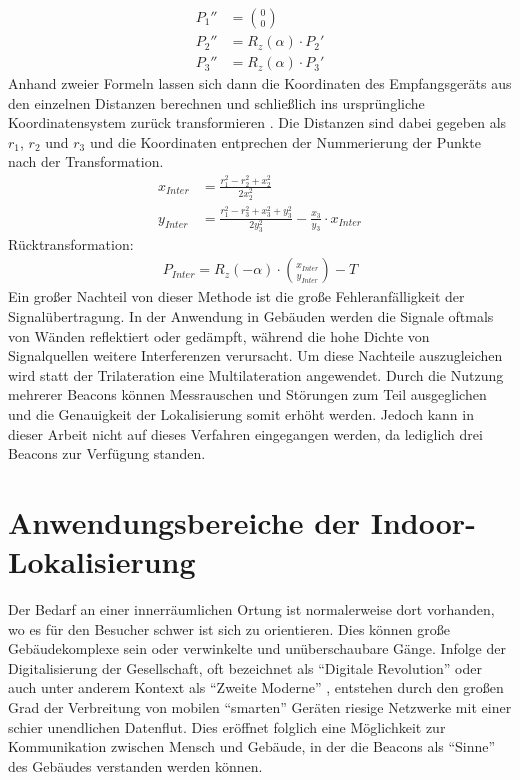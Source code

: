 \begin{align*}
P_1'' &= \binom{0}{0}\\
P_2'' &= R_z\left ( \alpha \right ) \cdot P_2'\\
P_3'' &= R_z\left ( \alpha \right ) \cdot P_3'
\end{align*}
Anhand zweier Formeln lassen sich dann die Koordinaten des Empfangsgeräts aus den einzelnen Distanzen berechnen und schließlich ins ursprüngliche Koordinatensystem zurück transformieren \cite{Trilat}. Die Distanzen sind dabei gegeben als $r_1$, $r_2$ und $r_3$ und die Koordinaten entprechen der Nummerierung der Punkte nach der Transformation.
\begin{align*}
x_{Inter} &= \frac{r_1^2-r_2^2+x_2^2}{2x_2^2}\\
y_{Inter} &= \frac{r_1^2-r_3^2+x_3^2+y_3^2}{2y_3^2}-\frac{x_3}{y_3}\cdot x_{Inter}
\end{align*}
Rücktransformation:
\begin{align*}
P_{Inter} = R_z\left ( -\alpha \right ) \cdot \binom{x_{Inter}}{y_{Inter}} - T
\end{align*}
Ein großer Nachteil von dieser Methode ist die große Fehleranfälligkeit der Signalübertragung. In der Anwendung in Gebäuden werden die Signale oftmals von Wänden reflektiert oder gedämpft, während die hohe Dichte von Signalquellen weitere Interferenzen verursacht. Um diese Nachteile auszugleichen wird statt der Trilateration eine Multilateration angewendet. Durch die Nutzung mehrerer Beacons können Messrauschen und Störungen zum Teil ausgeglichen und die Genauigkeit der Lokalisierung somit erhöht werden. Jedoch kann in dieser Arbeit nicht auf dieses Verfahren eingegangen werden, da lediglich drei Beacons zur Verfügung standen. 

\section{Anwendungsbereiche der Indoor-Lokalisierung}
Der Bedarf an einer innerräumlichen Ortung ist normalerweise dort vorhanden, wo es für den Besucher schwer ist sich zu orientieren. Dies können große Gebäudekomplexe sein oder verwinkelte und unüberschaubare Gänge. Infolge der Digitalisierung der Gesellschaft, oft bezeichnet als "`Digitale Revolution"' oder auch unter anderem Kontext als "`Zweite Moderne"' \cite{DigRev}, entstehen durch den großen Grad der Verbreitung von mobilen "`smarten"' Geräten riesige Netzwerke mit einer schier unendlichen Datenflut. Dies eröffnet folglich eine Möglichkeit zur Kommunikation zwischen Mensch und Gebäude, in der die Beacons als "`Sinne"' des Gebäudes verstanden werden können.  
